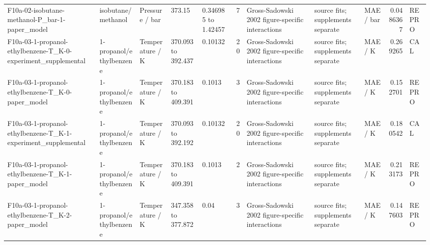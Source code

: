 \begin{landscape}
\begin{longtable}{L{1.9cm}L{2.5cm}L{2.1cm}L{1.6cm}L{1.6cm}rL{2.4cm}L{1.9cm}L{2.2cm}rL{1cm}}
F10a-\allowbreak{}02-\allowbreak{}isobutane-\allowbreak{}methanol-\allowbreak{}P\_\allowbreak{}bar-\allowbreak{}1-\allowbreak{}paper\_\allowbreak{}model & isobutane/\allowbreak{}methanol & Pressure /\allowbreak{} bar & 373.15 & 0.346985 to 1.42457 & 7 & Gross-\allowbreak{}Sadowski 2002 figure-\allowbreak{}specific interactions & source fits; supplements separate & MAE /\allowbreak{} bar & 0.0486367 & REPRO \\
F10a-\allowbreak{}03-\allowbreak{}1-\allowbreak{}propanol-\allowbreak{}ethylbenzene-\allowbreak{}T\_\allowbreak{}K-\allowbreak{}0-\allowbreak{}experiment\_\allowbreak{}supplemental & 1-\allowbreak{}propanol/\allowbreak{}ethylbenzene & Temperature /\allowbreak{} K & 370.093 to 392.437 & 0.10132 & 20 & Gross-\allowbreak{}Sadowski 2002 figure-\allowbreak{}specific interactions & source fits; supplements separate & MAE /\allowbreak{} K & 0.269265 & CAL \\
F10a-\allowbreak{}03-\allowbreak{}1-\allowbreak{}propanol-\allowbreak{}ethylbenzene-\allowbreak{}T\_\allowbreak{}K-\allowbreak{}0-\allowbreak{}paper\_\allowbreak{}model & 1-\allowbreak{}propanol/\allowbreak{}ethylbenzene & Temperature /\allowbreak{} K & 370.183 to 409.391 & 0.1013 & 3 & Gross-\allowbreak{}Sadowski 2002 figure-\allowbreak{}specific interactions & source fits; supplements separate & MAE /\allowbreak{} K & 0.152701 & REPRO \\
F10a-\allowbreak{}03-\allowbreak{}1-\allowbreak{}propanol-\allowbreak{}ethylbenzene-\allowbreak{}T\_\allowbreak{}K-\allowbreak{}1-\allowbreak{}experiment\_\allowbreak{}supplemental & 1-\allowbreak{}propanol/\allowbreak{}ethylbenzene & Temperature /\allowbreak{} K & 370.093 to 392.192 & 0.10132 & 20 & Gross-\allowbreak{}Sadowski 2002 figure-\allowbreak{}specific interactions & source fits; supplements separate & MAE /\allowbreak{} K & 0.180542 & CAL \\
F10a-\allowbreak{}03-\allowbreak{}1-\allowbreak{}propanol-\allowbreak{}ethylbenzene-\allowbreak{}T\_\allowbreak{}K-\allowbreak{}1-\allowbreak{}paper\_\allowbreak{}model & 1-\allowbreak{}propanol/\allowbreak{}ethylbenzene & Temperature /\allowbreak{} K & 370.183 to 409.391 & 0.1013 & 2 & Gross-\allowbreak{}Sadowski 2002 figure-\allowbreak{}specific interactions & source fits; supplements separate & MAE /\allowbreak{} K & 0.213173 & REPRO \\
F10a-\allowbreak{}03-\allowbreak{}1-\allowbreak{}propanol-\allowbreak{}ethylbenzene-\allowbreak{}T\_\allowbreak{}K-\allowbreak{}2-\allowbreak{}paper\_\allowbreak{}model & 1-\allowbreak{}propanol/\allowbreak{}ethylbenzene & Temperature /\allowbreak{} K & 347.358 to 377.872 & 0.04 & 3 & Gross-\allowbreak{}Sadowski 2002 figure-\allowbreak{}specific interactions & source fits; supplements separate & MAE /\allowbreak{} K & 0.147603 & REPRO \\

\end{longtable}
\end{landscape}
